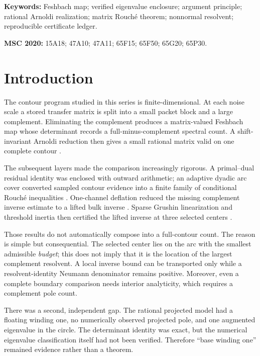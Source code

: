 \documentclass[11pt]{article}
\theoremstyle{definition}
\theoremstyle{remark}
\begin{document}
\noindent\textbf{Keywords:} Feshbach map; verified eigenvalue enclosure;
argument principle; rational Arnoldi realization; matrix Rouch\'e theorem;
nonnormal resolvent; reproducible certificate ledger.

\medskip
\noindent\textbf{MSC 2020:} 15A18; 47A10; 47A11; 65F15; 65F50; 65G20;
65P30.


\section{Introduction}
\label{sec:introduction}

The contour program studied in this series is finite-dimensional.  At each
noise scale a stored transfer matrix is split into a small packet block and
a large complement.  Eliminating the complement produces a matrix-valued
Feshbach map whose determinant records a full-minus-complement spectral
count.  A shift-invariant Arnoldi reduction then gives a small rational
matrix valid on one complete contour
\citep{WangContourFeshbach2026,SjoestrandZworski2007}.

The subsequent layers made the comparison increasingly rigorous.  A
primal--dual residual identity was enclosed with outward arithmetic; an
adaptive dyadic arc cover converted sampled contour evidence into a finite
family of conditional Rouch\'e inequalities
\citep{WangArcwise2026,GohbergSigal1971}.  One-channel deflation reduced the
missing complement inverse estimate to a lifted bulk inverse
\citep{WangDeflated2026}.  Sparse Grushin linearization and threshold
inertia then certified the lifted inverse at three selected centers
\citep{WangSparseGrushin2026,WangThresholdInertia2026}.

Those results do not automatically compose into a full-contour count.  The
reason is simple but consequential.  The selected center lies on the arc
with the smallest admissible \emph{budget}; this does not imply that it is
the location of the largest complement resolvent.  A local inverse bound
can be transported only while a resolvent-identity Neumann denominator
remains positive.  Moreover, even a complete boundary comparison needs
interior analyticity, which requires a complement pole count.

There was a second, independent gap.  The rational projected model had a
floating winding one, no numerically observed projected pole, and one
augmented eigenvalue in the circle.  The determinant identity was exact,
but the numerical eigenvalue classification itself had not been verified.
Therefore ``base winding one'' remained evidence rather than a theorem.
\end{document}
